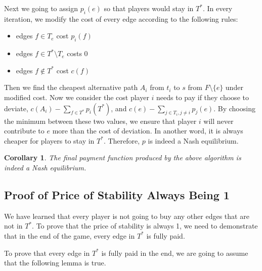 \documentclass[11pt,psfig,times]{article}
\newtheorem{corollary}{Corollary}[section]
\begin{document}
Next we going to assign \(p_i(e)\) so that players would stay in \(T^*\). In every iteration, we modify the cost of every edge according to the following rules:
\begin{itemize}
	\item edges \(f \in T_e\) cost \(p_i(f)\)
	\item edges \(f \in T^*\setminus T_e\) costs 0
	\item edges \(f\notin T^*\) cost \(c(f)\)
\end{itemize}
Then we find the cheapest alternative path \(A_i\) from \(t_i\) to \(s\) from \(F\setminus \{e\}\) under modified cost. 
Now we consider the cost player \(i\) needs to pay if they choose to deviate, \(c(A_i) - \sum_{f\in T^*}p_i(T^*)\), and \(c(e) - \sum_{j\in T_i,j\neq i}p_j(e)\). By choosing the minimum between these two values, we ensure that player \(i\) will never contribute to \(e\) more than the cost of deviation. In another word, it is always  cheaper for players to stay in \(T^*\). Therefore, \(p\) is indeed a Nash equilibrium. 
\begin{corollary}
	The final payment function produced by the above algorithm is indeed a Nash equilibrium.
\end{corollary}

\subsection{Proof of Price of Stability Always Being 1}
We have learned that every player is not going to buy any other edges that are not in \(T^*\). 
To prove that the price of stability is always 1, we need to demonstrate that in the end of the game, every edge in \(T^*\) is fully paid. 
  

To prove that every edge in \(T^*\) is fully paid in the end, we are going to assume that the following lemma is true. 
\end{document}

